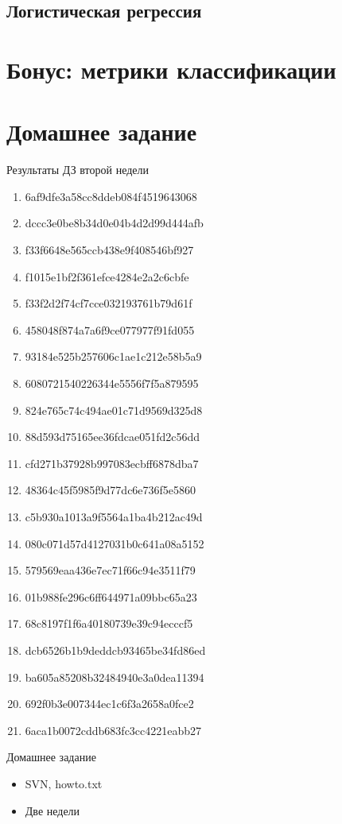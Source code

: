 \documentclass[14pt, fleqn, xcolor={dvipsnames, table}]{beamer}
\begin{document}
\subsection{Логистическая регрессия}
\section{Бонус: метрики классификации}

\section{Домашнее задание}
\begin{frame}{Результаты ДЗ второй недели}
\scriptsize
\begin{center}
\begin{enumerate}
\item 6af9dfe3a58cc8ddeb084f4519643068
\item dccc3e0be8b34d0e04b4d2d99d444afb
\item f33f6648e565ccb438e9f408546bf927
\item f1015e1bf2f361efce4284e2a2c6cbfe
\item f33f2d2f74cf7cce032193761b79d61f
\item 458048f874a7a6f9ce077977f91fd055
\item 93184e525b257606c1ae1c212e58b5a9
\item 6080721540226344e5556f7f5a879595
\item 824e765c74c494ae01c71d9569d325d8
\item 88d593d75165ee36fdcae051fd2c56dd
\item cfd271b37928b997083ecbff6878dba7
\item 48364c45f5985f9d77dc6e736f5e5860
\item c5b930a1013a9f5564a1ba4b212ac49d
\item 080c071d57d4127031b0c641a08a5152
\item 579569eaa436e7ec71f66c94e3511f79
\item 01b988fe296c6ff644971a09bbc65a23
\item 68c8197f1f6a40180739e39c94ecccf5
\item dcb6526b1b9deddcb93465be34fd86ed
\item ba605a85208b32484940e3a0dea11394
\item 692f0b3e007344ec1c6f3a2658a0fce2
\item 6aca1b0072cddb683fc3cc4221eabb27
\end{enumerate}
\end{center}
\end{frame}
\begin{frame}{Домашнее задание}
\begin{itemize}
\item SVN, howto.txt
\item Две недели
\end{itemize}
\end{frame}
\end{document}
